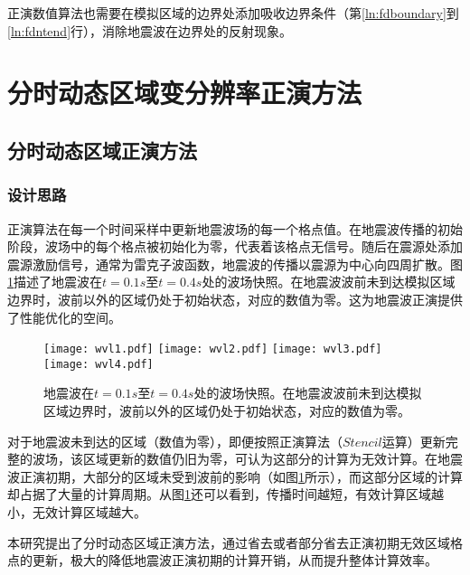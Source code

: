 正演数值算法也需要在模拟区域的边界处添加吸收边界条件（第\ref{ln:fdboundary}到\ref{ln:fdntend}行），消除地震波在边界处的反射现象。







\section{分时动态区域变分辨率正演方法} %
\subsection{分时动态区域正演方法} %

\subsubsection{设计思路}
正演算法在每一个时间采样中更新地震波场的每一个格点值。在地震波传播的初始阶段，波场中的每个格点被初始化为零，代表着该格点无信号。随后在震源处添加震源激励信号，通常为雷克子波函数，地震波的传播以震源为中心向四周扩散。图\ref{fig:地震波传播示例}描述了地震波在$t=0.1s$至$t=0.4s$处的波场快照。在地震波波前未到达模拟区域边界时，波前以外的区域仍处于初始状态，对应的数值为零。这为地震波正演提供了性能优化的空间。

\begin{figure}[ht]
  \centering
  \texttt{[image: wvl1.pdf]}
  \texttt{[image: wvl2.pdf]}
  \texttt{[image: wvl3.pdf]}
  \texttt{[image: wvl4.pdf]}
  \caption{地震波在$t=0.1s$至$t=0.4s$处的波场快照。在地震波波前未到达模拟区域边界时，波前以外的区域仍处于初始状态，对应的数值为零。}
  \label{fig:地震波传播示例}
\end{figure}

对于地震波未到达的区域（数值为零），即便按照正演算法（$Stencil$运算）更新完整的波场，该区域更新的数值仍旧为零，可认为这部分的计算为无效计算。在地震波正演初期，大部分的区域未受到波前的影响（如图\ref{fig:地震波传播示例}所示），而这部分区域的计算却占据了大量的计算周期。从图\ref{fig:地震波传播示例}还可以看到，传播时间越短，有效计算区域越小，无效计算区域越大。

本研究提出了分时动态区域正演方法，通过省去或者部分省去正演初期无效区域格点的更新，极大的降低地震波正演初期的计算开销，从而提升整体计算效率。

